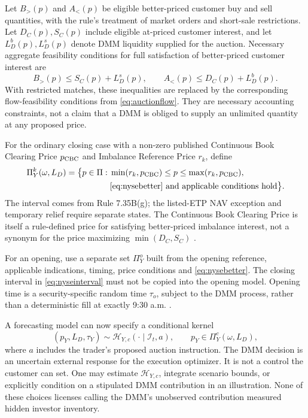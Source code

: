 \documentclass[11pt]{article}
\numberwithin{equation}{section}
\theoremstyle{definition}
\theoremstyle{remark}
\theoremstyle{definition}
\begin{document}
Let $B_>(p)$ and $A_<(p)$ be eligible better-priced customer buy and sell
quantities, with the rule's treatment of market orders and short-sale
restrictions. Let $D_C(p),S_C(p)$ include eligible at-priced customer interest,
and let $L_D^b(p),L_D^s(p)$ denote DMM liquidity supplied for the auction.
Necessary aggregate feasibility conditions for full satisfaction of
better-priced customer interest are
\begin{equation}\label{eq:nysebetter}
 B_>(p)\leq S_C(p)+L_D^s(p),\qquad
 A_<(p)\leq D_C(p)+L_D^b(p).
\end{equation}
With restricted matches, these inequalities are replaced by the corresponding
flow-feasibility conditions from \eqref{eq:auctionflow}. They are necessary
accounting constraints, not a claim that a DMM is obliged to supply an unlimited
quantity at any proposed price.

For the ordinary closing case with a non-zero published Continuous Book Clearing
Price $p_{\rm CBC}$ and Imbalance Reference Price $r_k$, define
\begin{equation}\label{eq:nyseinterval}
\begin{split}
 \Pi_Y^k(\omega,L_D)=\bigl\{p\in\Pi:\;&
 \min(r_k,p_{\rm CBC})\leq p\leq\max(r_k,p_{\rm CBC}),\\
 &\text{\eqref{eq:nysebetter} and applicable conditions hold}\bigr\}.
\end{split}
\end{equation}
The interval comes from Rule 7.35B(g); the listed-ETP NAV exception and temporary
relief require separate states. The Continuous Book Clearing Price is itself a
rule-defined price for satisfying better-priced imbalance interest, not a
synonym for the price maximizing $\min(D_C,S_C)$ \citep{nyseauctiongeneral,nysecloserule}.

For an opening, use a separate set $\Pi_Y^o$ built from the opening reference,
applicable indications, timing, price conditions and \eqref{eq:nysebetter}.
The closing interval in \eqref{eq:nyseinterval} must not be copied into the
opening model. Opening time is a security-specific random time $\tau_o$, subject
to the DMM process, rather than a deterministic fill at exactly 9:30 a.m.
\citep{nyseopenrule}.

A forecasting model can now specify a conditional kernel
\begin{equation}\label{eq:dmmkernel}
 (p_Y,L_D,\tau_Y)\sim\mathcal H_{Y,c}
   (\cdot\mid\mathcal I_t,a),\qquad
 p_Y\in\Pi_Y^c(\omega,L_D),
\end{equation}
where $a$ includes the trader's proposed auction instruction. The DMM decision
is an uncertain external response for the execution optimizer. It is not a
control the customer can set. One may estimate $\mathcal H_{Y,c}$, integrate
scenario bounds, or explicitly condition on a stipulated DMM contribution in
an illustration. None of these choices licenses calling the DMM's unobserved
contribution measured hidden investor inventory.
\end{document}
